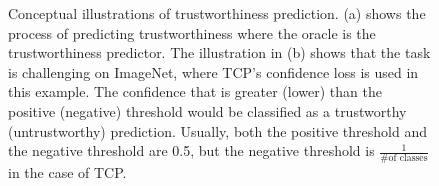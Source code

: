 \begin{figure}[!t]
	\centering
	 \hfill
	\caption{\label{fig:teaser}
    	Conceptual illustrations of trustworthiness prediction. 
    	(a) shows the process of predicting trustworthiness where the oracle is the trustworthiness predictor. 
    	The illustration in (b) shows that the task is challenging on ImageNet, where TCP's confidence loss \cite{Corbiere_NIPS_2019} is used in this example.
    	The confidence that is greater (lower) than the positive (negative) threshold would be classified as a trustworthy (untrustworthy) prediction.
    	Usually, both the positive threshold and the negative threshold are 0.5, but the negative threshold is $\frac{1}{\text{\# of classes}}$ in the case of TCP. 
    	}
\end{figure}